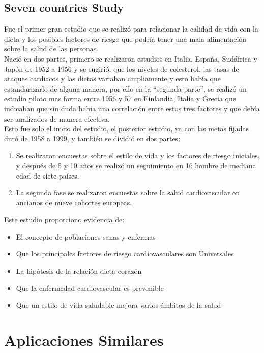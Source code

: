 \subsection{Seven countries Study \cite{sevenCountries}}
Fue el primer gran estudio que se realizó para relacionar la calidad de vida con la dieta y los posibles factores de riesgo que podría tener una mala alimentación sobre la salud de las personas.\\
Nació en dos partes, primero se realizaron estudios en Italia, España, Sudáfrica y Japón de 1952 a 1956 y se sugirió, que los niveles de colesterol, las tasas de ataques cardiacos y las dietas variaban ampliamente y esto había que estandarizarlo de alguna manera, por ello en la “segunda parte”, se realizó un estudio piloto mas forma entre 1956 y 57 en Finlandia, Italia y Grecia que indicaban que sin duda había una correlación entre estos tres factores y que debía ser analizados de manera efectiva.\\
Esto fue solo el inicio del estudio, el posterior estudio, ya con las metas fijadas duró de 1958 a 1999, y también se dividió en dos partes: \\
\begin{enumerate}
	\item Se realizaron encuestas sobre el estilo de vida y los factores de riesgo iniciales, y después de 5 y 10 años se realizó un seguimiento en 16 hombre de mediana edad de siete países.
	\item La segunda fase se realizaron encuestas sobre la salud cardiovascular en ancianos de nueve cohortes europeas.
\end{enumerate}
Este estudio proporciono evidencia de:
\begin{itemize}
\item El concepto de poblaciones sanas y enfermas
\item Que los principales factores de riesgo cardiovasculares son Universales
\item La hipótesis de la relación dieta-corazón
\item Que la enfermedad cardiovascular es prevenible
\item Que un estilo de vida saludable mejora varios ámbitos de la salud

\end{itemize}

\section{Aplicaciones Similares}

